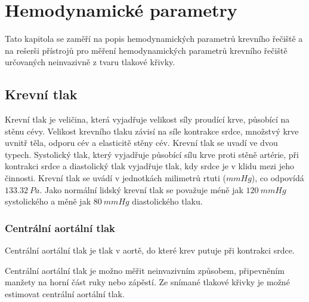 \chapter{Hemodynamické parametry}
Tato kapitola se zaměří na popis hemodynamických parametrů krevního řečiště a na rešerši přístrojů pro měření hemodynamických parametrů krevního řečiště určovaných neinvazivně z tvaru
tlakové křivky.
\section{Krevní tlak}
Krevní tlak je veličina, která vyjadřuje velikost síly proudící krve, působící na stěnu cévy. Velikost krevního tlaku závisí na síle kontrakce srdce, množstvý krve uvnitř těla,
odporu cév a elasticitě stěny cév. Krevní tlak se uvadí ve dvou typech. Systolický tlak, který vyjadřuje působící sílu krve proti stěně artérie, při kontrakci srdce a diastolický tlak vyjadřuje
tlak, kdy srdce je v klidu mezi jeho činnosti. Krevní tlak se uvádí v jednotkách milimetrů rtuti ($mmHg$), co odpovídá $133.32 \  Pa$. Jako normální lidský krevní tlak se považuje méně jak $120 \ mmHg$ systolického a měně jak  $80 \ mmHg$ diastolického tlaku.
\cite{cite:BP}

\subsection{Centrální aortální tlak}
Centrální aortální tlak je tlak v aortě, do které krev putuje při kontrakci srdce.\cite{cite:CBP}\par
Centrální aortální tlak je možno měřit neinvazivním způsobem, připevněním manžety na horní část ruky nebo zápěstí. Ze snímané tlakové křivky je
možné estimovat centrální aortální tlak.\cite{cite:CBP}

